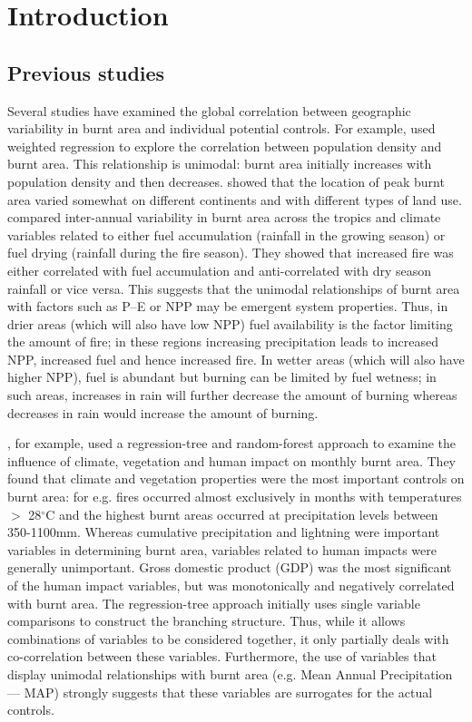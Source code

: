 \section{Introduction}
\subsection{Previous studies}
Several studies have examined the global correlation between geographic variability in burnt area and individual potential controls. For example, \citet{bistinas2013relationships} used weighted regression to explore the correlation between population density and burnt area. This relationship is unimodal: burnt area initially increases with population density and then decreases. \citet{bistinas2013relationships} showed that the location of peak burnt area varied somewhat on different continents and with different types of land use. \citet{van2008climate} compared inter-annual variability in burnt area across the tropics and climate variables related to either fuel accumulation (rainfall in the growing season) or fuel drying (rainfall during the fire season). They showed that increased fire was either correlated with fuel accumulation and anti-correlated with dry season rainfall or vice versa. This suggests that the unimodal relationships of burnt area with factors such as P--E or NPP may be emergent system properties. Thus, in drier areas (which will also have low NPP) fuel availability is the factor limiting the amount of fire; in these regions increasing precipitation leads to increased NPP, increased fuel and hence increased fire. In wetter areas (which will also have higher NPP), fuel is abundant but burning can be limited by fuel wetness; in such areas, increases in rain will further decrease the amount of burning whereas decreases in rain would increase the amount of burning.

\citet{aldersley2011global}, for example, used a regression-tree and random-forest approach to examine the influence of climate, vegetation and human impact on monthly burnt area. They found that climate and vegetation properties were the most important controls on burnt area: for e.g. fires occurred almost exclusively in months with temperatures $>$ 28$^{\circ}$C and the highest burnt areas occurred at precipitation levels between 350-1100mm. Whereas cumulative precipitation and lightning were important variables in determining burnt area, variables related to human impacts were generally unimportant. Gross domestic product (GDP) was the most significant of the human impact variables, but was monotonically and negatively correlated with burnt area. The regression-tree approach initially uses single variable comparisons to construct the branching structure. Thus, while it allows combinations of variables to be considered together, it only partially deals with co-correlation between these variables. Furthermore, the use of variables that display unimodal relationships with burnt area (e.g. Mean Annual Precipitation --- MAP) strongly suggests that these variables are surrogates for the actual controls.

